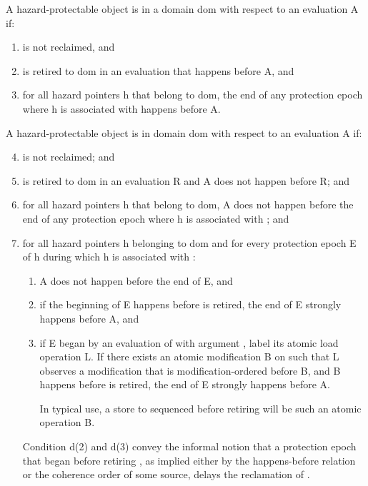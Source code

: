 A hazard-protectable object  is  in a domain dom with respect to
an evaluation A if:
\begin{enumerate}
\item {} is not reclaimed, and
\item {} is retired to dom in an evaluation that happens before A, and
\item for all hazard pointers h that belong to dom, the end of any protection epoch where h is associated with  happens before A.
\end{enumerate}

A hazard-protectable object  is  in domain dom with respect to an
evaluation A if:
\begin{enumerate}
\setcounter{enumi}{3}
\item {} is not reclaimed; and
\item {} is retired to dom in an evaluation R and A does not happen before R; and
\item for all hazard pointers h that belong to dom, A does not happen before the end of
any protection epoch where h is associated with ; and
\item for all hazard pointers h belonging to dom and for every protection epoch E of h
during which h is associated with :
\begin{enumerate}
  \item A does not happen before the end of E, and
  \item if the beginning of E happens before  is retired, the end of E strongly
happens before A, and
  \item if E began by an evaluation of  with argument , label its
atomic load operation L. If there exists an atomic modification B on  such that L observes a modification that is modification-ordered before B, and B happens before  is retired, the end of E strongly happens before A. \begin{note} In typical use, a store to  sequenced before retiring  will be such an atomic operation B.\end{note}
\end{enumerate}
\begin{note} Condition d(2) and d(3) convey the informal notion that a protection epoch that began before retiring , as implied either by the happens-before relation or the coherence order of some source, delays the reclamation of .\end{note}
\end{enumerate}

